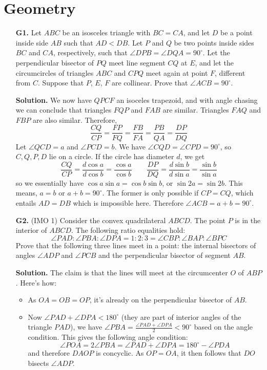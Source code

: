 \documentclass[11pt,a4paper]{article}
\begin{document}
\section*{Geometry}
\begin{enumerate}
	\item [\textbf{G1.}] Let $ABC$ be an isosceles triangle with $BC=CA$, and let $D$ be a point inside side $AB$ such that $AD< DB$. Let $P$ and $Q$ be two points inside sides $BC$ and $CA$, respectively, such that $\angle DPB = \angle DQA = 90^{\circ}$. Let the perpendicular bisector of $PQ$ meet line segment $CQ$ at $E$, and let the circumcircles of triangles $ABC$ and $CPQ$ meet again at point $F$, different from $C$.
	Suppose that $P$, $E$, $F$ are collinear. Prove that $\angle ACB = 90^{\circ}$.
	
	\textbf{Solution.} We now have $QPCF$ an isoceles trapezoid, and with angle chasing we can conclude that triangles $FQP$ and $FAB$ are similar. Triangles $FAQ$ and $FBP$ are also similar. Therefore, 
	\[
	\frac{CQ}{CP}=\frac{FP}{FQ}=\frac{FB}{FA}=\frac{PB}{QA}=\frac{DP}{DQ}
	\]
	Let $\angle QCD=a$ and $\angle PCD=b$. We have $\angle CQD=\angle CPD=90^{\circ}$, so $C, Q, P, D$ lie on a circle. If the circle has diameter $d$, we get 
	\[
	\frac{CQ}{CP}=\frac{d\cos a}{d\cos b}=\frac{\cos a}{\cos b}\qquad
	\frac{DP}{DQ}=\frac{d\sin b}{d\sin a}=\frac{\sin b}{\sin a}
	\]
	so we essentially have $\cos a\sin a=\cos b\sin b$, or $\sin 2a=\sin 2b$. This means, $a=b$ or $a+b=90^{\circ}$. The former is only possible if $CP=CQ$, which entails $AD=DB$ which is impossible here. Therefore $\angle ACB=a+b=90^{\circ}$. 
	\item [\textbf{G2.}] (IMO 1)
	Consider the convex quadrilateral $ABCD$. The point $P$ is in the interior of $ABCD$. The following ratio equalities hold:
	\[\angle PAD:\angle PBA:\angle DPA=1:2:3=\angle CBP:\angle BAP:\angle BPC\]Prove that the following three lines meet in a point: the internal bisectors of angles $\angle ADP$ and $\angle PCB$ and the perpendicular bisector of segment $AB$.
	
	\textbf{Solution.} The claim is that the lines will meet at the circumcenter $O$ of $ABP$. Here's how: 
	\begin{itemize}
		\item As $OA=OB=OP$, it's already on the perpendicular bisector of $AB$. 
		
		\item Now $\angle PAD+\angle DPA<180^{\circ}$ (they are part of interior angles of the triangle $PAD$), we have $\angle PBA=\frac{\angle PAD+\angle DPA}{2}<90^{\circ}$ based on the angle condition. This gives the following angle condition: 
		\[
		\angle POA=2\angle PBA=\angle PAD+\angle DPA=180^{\circ}-\angle PDA
		\]
		and therefore $DAOP$ is concyclic. As $OP=OA$, it then follows that $DO$ bisects $\angle ADP$. 
		

\end{itemize}
\end{enumerate}
\end{document}
